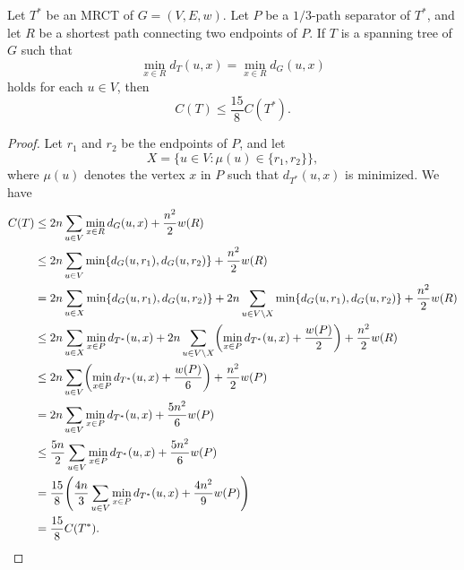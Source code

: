 \documentclass[11pt]{article}
\begin{document}
\begin{theorem}
  Let $T^*$ be an MRCT of $G = (V, E, w)$.
  Let $P$ be a $1/3$-path separator of $T^*$, and let $R$ be a shortest path connecting two endpoints of $P$.
  If $T$ is a spanning tree of $G$ such that
  \begin{equation*}
    \min_{x \in R} d_T(u, x) = \min_{x \in R} d_G(u, x)
  \end{equation*}
  holds for each $u \in V$, then
  \begin{equation*}
    C(T) \leq \frac{15}{8}C(T^*).
  \end{equation*}
\end{theorem}
\begin{proof}
  Let $r_1$ and $r_2$ be the endpoints of $P$, and let
  \begin{equation*}
    X = \{u \in V: \mu(u) \in \{r_1, r_2\}\},
  \end{equation*}
  where $\mu(u)$ denotes the vertex $x$ in $P$ such that $d_{T^*}(u, x)$ is minimized.
  We have
  \begin{align*}
    C(T)
    &\leq 2n \sum_{u \in V} \min_{x \in R} d_G(u, x) + \frac{n^2}{2} w(R) \\
    &\leq 2n \sum_{u \in V} \min \{d_G(u, r_1), d_G(u, r_2)\} + \frac{n^2}{2} w(R) \\
    &= 2n \sum_{u \in X} \min \{d_G(u, r_1), d_G(u, r_2)\} + 2n \sum_{u \in V \setminus X} \min \{d_G(u, r_1), d_G(u, r_2)\} + \frac{n^2}{2} w(R) \\
    &\leq 2n \sum_{u \in X} \min_{x \in P} d_{T^*}(u, x) + 2n \sum_{u \in V \setminus X} \biggl(\min_{x \in P} d_{T^*}(u, x) + \frac{w(P)}{2}\biggr) + \frac{n^2}{2} w(R) \\
    &\leq 2n \sum_{u \in V} \biggl(\min_{x \in P} d_{T^*}(u, x) + \frac{w(P)}{6}\biggr) + \frac{n^2}{2}w(P) \\
    &= 2n \sum_{u \in V} \min_{x \in P} d_{T^*}(u, x) + \frac{5n^2}{6}w(P) \\
    &\leq \frac{5n}{2} \sum_{u \in V} \min_{x \in P} d_{T^*}(u, x) + \frac{5n^2}{6}w(P) \\
    &= \frac{15}{8}\Biggl(\frac{4n}{3} \sum_{u \in V} \min_{x \in P} d_{T^*}(u, x) + \frac{4n^2}{9}w(P)\Biggr) \\
    &= \frac{15}{8}C(T^*).
    \qedhere
  \end{align*}
\end{proof}
\end{document}
